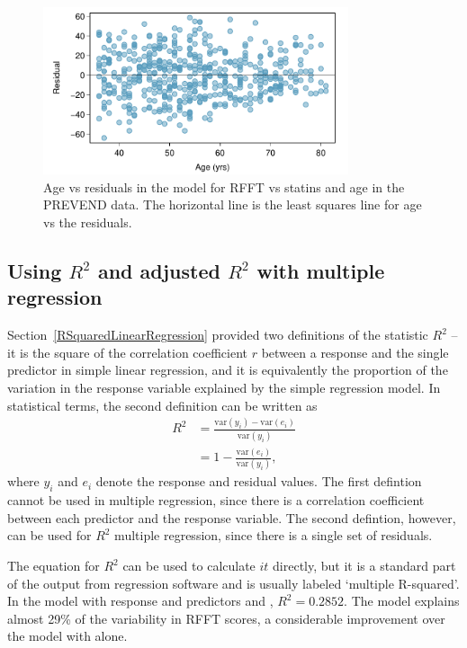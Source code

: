 \begin{figure}[h!]
	\centering
	\includegraphics[width=0.8\textwidth]
	{ch_multiple_linear_regression_oi_biostat/figures/statinAgeResidPlot/statinAgeResidPlot.pdf}
	\caption{Age vs residuals in the model for RFFT vs statins and age in the PREVEND data.  The horizontal line is the least squares line for age vs the residuals.}
	\label{statinAgeResidPlot}
\end{figure}



\subsection{Using $R^2$ and adjusted $R^2$ with multiple regression}


Section~\ref{RSquaredLinearRegression} provided two definitions of the statistic $R^2$ -- it is the square of the correlation coefficient $r$ between a response and the single predictor in simple linear regression, and it is equivalently the proportion of the variation in the response variable explained by the simple regression model.  In statistical terms, the second definition can be written as 
\begin{align*}
   R^2 &= \frac{\text{var}(y_i) - \text{var}(e_i)}
   {\text{var}(y_i)}\\
   &= 1 - \frac{\text{var}(e_i)}{\text{var}(y_i)},
   \label{RSquareDefinition}
\end{align*}
where $y_i$ and $e_i$ denote the response and residual values.
The first defintion cannot be used in multiple regression, since there is a correlation coefficient between each predictor and the response variable.  The second defintion, however, can be used for $R^2$ multiple regression, since there is a single set of residuals.

The equation for $R^2$ can be used to calculate $it$ directly, but it is a standard part of the output from regression software and is usually labeled `multiple R-squared'. In the  model with response  and predictors  and  , $R^2 = 0.2852$.  The model explains almost 29\% of the variability in RFFT scores, a considerable improvement over the model with  alone.


